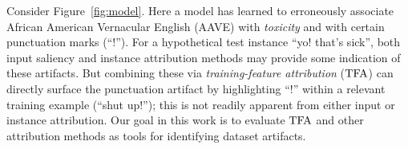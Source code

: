 \documentclass[11pt]{article}
\begin{document}
Consider Figure~\ref{fig:model}. 
Here a model has learned to erroneously associate African American Vernacular English (AAVE) with \emph{toxicity} \cite{sap2019risk} and with certain punctuation marks (``!''). 
For a hypothetical test instance ``yo! that's sick'', both input saliency and instance attribution methods may provide some indication of these artifacts.
But combining these via \emph{training-feature attribution} ($\text{TFA}$) can directly surface the punctuation artifact by highlighting ``!'' within a relevant training example (``shut up!''); this is not readily apparent from either input or instance attribution. 
Our goal in this work is to evaluate $\text{TFA}$ and other attribution methods as tools for identifying dataset artifacts. 
 
\end{document}
